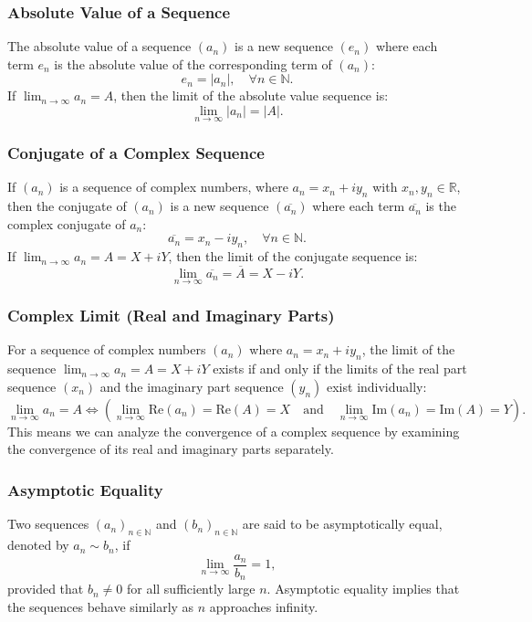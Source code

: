 \subsubsection{Absolute Value of a Sequence}
The absolute value of a sequence \((a_n)\) is a new sequence \((e_n)\) where each term \(e_n\) is the absolute value of the corresponding term of \((a_n)\):
\[
e_n = |a_n|, \quad \forall n \in \mathbb{N}.
\]
If \(\lim_{n \to \infty} a_n = A\), then the limit of the absolute value sequence is:
\[
\lim_{n \to \infty} |a_n| = |A|.
\]

\subsubsection{Conjugate of a Complex Sequence}
If \((a_n)\) is a sequence of complex numbers, where \(a_n = x_n + i y_n\) with \(x_n, y_n \in \mathbb{R}\), then the conjugate of \((a_n)\) is a new sequence \((\overline{a_n})\) where each term \(\overline{a_n}\) is the complex conjugate of \(a_n\):
\[
\overline{a_n} = x_n - i y_n, \quad \forall n \in \mathbb{N}.
\]
If \(\lim_{n \to \infty} a_n = A = X + i Y\), then the limit of the conjugate sequence is:
\[
\lim_{n \to \infty} \overline{a_n} = \overline{A} = X - i Y.
\]

\subsubsection{Complex Limit (Real and Imaginary Parts)}
For a sequence of complex numbers \((a_n)\) where \(a_n = x_n + i y_n\), the limit of the sequence \(\lim_{n \to \infty} a_n = A = X + i Y\) exists if and only if the limits of the real part sequence \((x_n)\) and the imaginary part sequence \((y_n)\) exist individually:
\[
\lim_{n \to \infty} a_n = A \iff \left( \lim_{n \to \infty} \text{Re}(a_n) = \text{Re}(A) = X \quad \text{and} \quad \lim_{n \to \infty} \text{Im}(a_n) = \text{Im}(A) = Y \right).
\]
This means we can analyze the convergence of a complex sequence by examining the convergence of its real and imaginary parts separately.

\subsubsection{Asymptotic Equality}
Two sequences \((a_n)_{n \in \mathbb{N}}\) and \((b_n)_{n \in \mathbb{N}}\) are said to be asymptotically equal, denoted by \(a_n \sim b_n\), if
\[
\lim_{n \to \infty} \frac{a_n}{b_n} = 1,
\]
provided that \(b_n \neq 0\) for all sufficiently large \(n\). Asymptotic equality implies that the sequences behave similarly as \(n\) approaches infinity.

